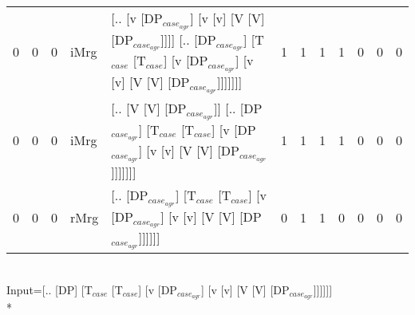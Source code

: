 \begin{tabularx}{\linewidth}{rrrlXrrrrrrr}
   0 &       0 &   0 & iMrg & [.. [v [DP$_{case_{agr}}$] [v [v] [V [V] [DP$_{case_{agr}}$]]]] [.. [DP$_{case_{agr}}$] [T$_{case}$ [T$_{case}$] [v [DP$_{case_{agr}}$] [v [v] [V [V] [DP$_{case_{agr}}$]]]]]]]                   &            1 &             1 &             1 &                  1 &              0 &                0 &              0 \\
   0 &       0 &   0 & iMrg & [.. [V [V] [DP$_{case_{agr}}$]] [.. [DP$_{case_{agr}}$] [T$_{case}$ [T$_{case}$] [v [DP$_{case_{agr}}$] [v [v] [V [V] [DP$_{case_{agr}}$]]]]]]]                                             &            1 &             1 &             1 &                  1 &              0 &                0 &              0 \\
   0 &       0 &   0 & rMrg & [.. [DP$_{case_{agr}}$] [T$_{case}$ [T$_{case}$] [v [DP$_{case_{agr}}$] [v [v] [V [V] [DP$_{case_{agr}}$]]]]]]                                                                        &            0 &             1 &             1 &                  0 &              0 &                0 &              0 \\
\hline
\end{tabularx}\endgroup\\
\begingroup\scriptsize Input=[.. [DP] [T$_{case}$ [T$_{case}$] [v [DP$_{case_{agr}}$] [v [v] [V [V] [DP$_{case_{agr}}$]]]]]]\\*

